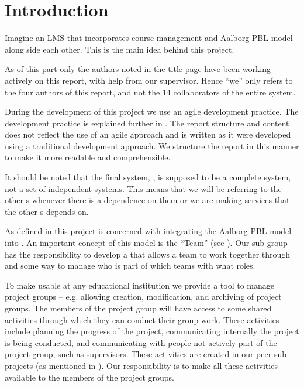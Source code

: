 \chapter{Introduction}
\label{chap:introProjectgroup}
Imagine an LMS that incorporates course management and Aalborg PBL model along side each other.
This is the main idea behind this project.

As of this part only the authors noted in the title page have been working actively on this report, with help from our supervisor.
Hence ``we'' only refers to the four authors of this report, and not the 14 collaborators of the entire system.

During the development of this project we use an agile development practice. 
The development practice is explained further in . 
The report structure and content does not reflect the use of an agile approach and is written as it were developed using a traditional development approach. 
We structure the report in this manner to make it more readable and comprehensible. 

It should be noted that the final system, \system{}, is supposed to be a complete system, not a set of independent systems.
This means that we will be referring to the other \subsystem{}s whenever there is a dependence on them or we are making services that the other \subsystem{}s depends on.



As defined in  this project is concerned with integrating the Aalborg PBL model into \moodle.
An important concept of this model is the ``Team'' (see ).
Our sub-group has the responsibility to develop a \subsystem{} that allows a team to work together through \moodle{} and some way to manage who is part of which teams with what roles.






To make \system{} usable at any educational institution we provide a tool to manage project groups -- e.g. allowing creation, modification, and archiving of project groups.
The members of the project group will have access to some shared activities through which they can conduct their group work.
These activities include planning the progress of the project, communicating internally the project is being conducted, and communicating with people not actively part of the project group, such as supervisors.
These activities are created in our peer sub-projects (as mentioned in ).
Our responsibility is to make all these activities available to the members of the project groups.




